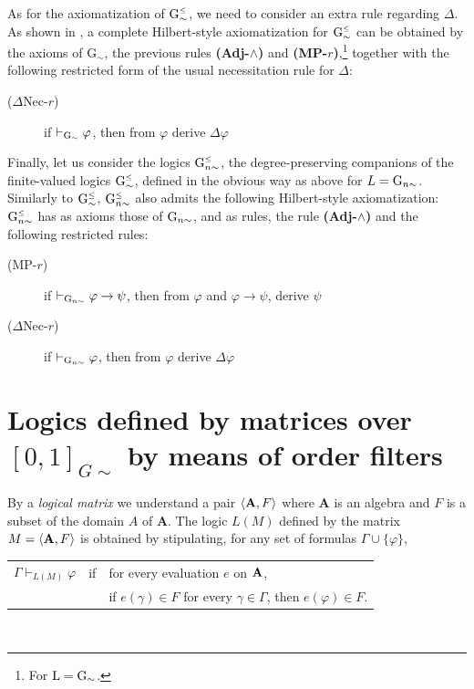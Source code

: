 \documentclass{article}
\theoremstyle{definition}
\newcommand{\logic}[1]{\mathrm{ #1}}
\newcommand{\Gsimleq}{\mathrm{G}\mystrut^{\text{\tiny $\leq$}}_{\sim}}
\newcommand{\Gnsimleq}{\mathrm{G}\mystrut^{\text{\tiny $\leq$}}_{n\sim}}
\newcommand\mystrut{\rule{0pt}{7pt}}
\begin{document}
As for the axiomatization of $\Gsimleq$, we need to consider an extra rule regarding $\Delta$. As shown in \cite{EEFGN}, a complete Hilbert-style axiomatization for  $\Gsimleq$ can be obtained by the axioms of G$_\sim$, the previous rules {\bf (Adj-$\wedge$)} and {\bf (MP-$r$)},\footnote{For $\logic{L} = {\rm G}_\sim$.} together with the following restricted form of the usual necessitation rule for $\Delta$:
\begin{description}
\item[($\Delta$Nec-$r$)] if $\vdash_{{\rm G}_\sim} \varphi$, then from $\varphi$ derive $\Delta \varphi$
\end{description}


Finally, let us consider the logics  $\Gnsimleq$, the degree-preserving companions of the finite-valued logics $\Gsimleq$, defined in the obvious way as above for $L = {\rm G}_{n \sim}$.
Similarly to $\Gsimleq$,  $\Gnsimleq$ also admits the following Hilbert-style axiomatization: $\Gnsimleq$ has as axioms those of ${\rm G}_{n \sim}$, and as rules, the rule {\bf (Adj-$\wedge$)} and  the following restricted rules:

\begin{description}
\item[(MP-$r$)] if $\vdash_{{\rm G}_{n \sim}} \varphi\to\psi$, then from $\varphi$ and $\varphi \to \psi$, derive $\psi$
\item[($\Delta$Nec-$r$)] if $\vdash_{{\rm G}_{n \sim}}\varphi$, then from $\varphi$ derive $\Delta \varphi$
\end{description}

\section{Logics defined by matrices over $[0,1]_{G \sim}$ by means of order filters} \label{sect-G-tilde}

By  a {\em logical matrix} we understand a pair $\langle {\bf A},F \rangle$ where {\bf A} is an algebra and $F$ is a subset of the domain $A$ of {\bf A}.  The logic $L(M)$ 
defined by the matrix $M = \langle {\bf A},F \rangle$ is obtained by stipulating, for any set of formulas $\Gamma \cup \{\varphi\}$, \\

\begin{tabular}{ lll }$ \Gamma \vdash_{L(M)} \varphi$ & if & for every evaluation $e$ on $\bf A$, \\ & & if $e(\gamma) \in F$ for every $\gamma \in \Gamma$, then $e(\varphi) \in F$.
\end{tabular} \ \\
\end{document}
